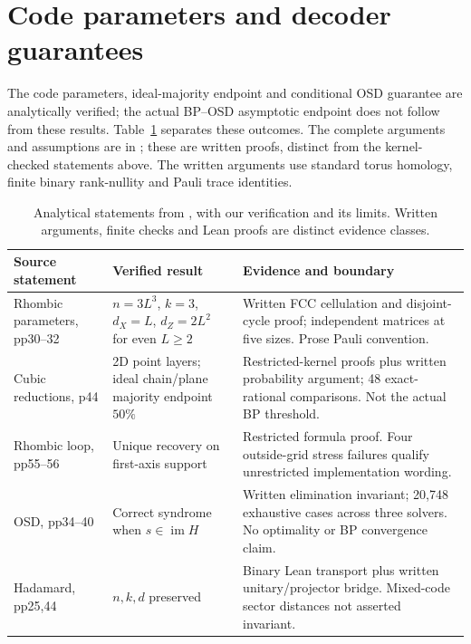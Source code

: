 \section{Code parameters and decoder guarantees}
The code parameters, ideal-majority endpoint and conditional OSD guarantee are analytically verified; the actual BP--OSD asymptotic endpoint does not follow from these results. Table~\ref{tab:analytical} separates these outcomes. The complete arguments and assumptions are in ; these are written proofs, distinct from the kernel-checked statements above. The written arguments use standard torus homology, finite binary rank-nullity and Pauli trace identities.

\begin{table}[htbp]\centering\small
\begin{tabular}{p{.21\linewidth}p{.31\linewidth}p{.39\linewidth}}\toprule
Source statement & Verified result & Evidence and boundary\\\midrule
Rhombic parameters, pp30--32 & $n=3L^3$, $k=3$, $d_X=L$, $d_Z=2L^2$ for even $L\ge2$ & Written FCC cellulation and disjoint-cycle proof; independent matrices at five sizes. Prose Pauli convention.\\
Cubic reductions, p44 & 2D point layers; ideal chain/plane majority endpoint $50\%$ & Restricted-kernel proofs plus written probability argument; 48 exact-rational comparisons. Not the actual BP threshold.\\
Rhombic loop, pp55--56 & Unique recovery on first-axis support & Restricted formula proof. Four outside-grid stress failures qualify unrestricted implementation wording.\\
OSD, pp34--40 & Correct syndrome when $s\in\operatorname{im}H$ & Written elimination invariant; 20,748 exhaustive cases across three solvers. No optimality or BP convergence claim.\\
Hadamard, pp25,44 & $n,k,d$ preserved & Binary Lean transport plus written unitary/projector bridge. Mixed-code sector distances not asserted invariant.\\\bottomrule
\end{tabular}
\caption{Analytical statements from \citet{pesah2021}, with our verification and its limits. Written arguments, finite checks and Lean proofs are distinct evidence classes.}\label{tab:analytical}
\end{table}


